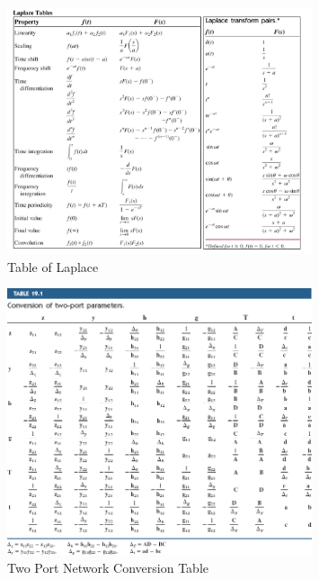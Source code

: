 \documentclass[10pt,landscape]{article}
\theoremstyle{definition}
\theoremstyle{remark}
\begin{document}
\begin{figure}
    \centering
    \includegraphics[width=0.8\textwidth,height=\textheight,keepaspectratio]{202/figure/laplace_transforms.png}
    \caption{Table of Laplace \cite{linares}}
    \label{fig:lapace_tb}
\end{figure}

\begin{figure}
    \centering
    \includegraphics[width=0.8\textwidth,height=\textheight,keepaspectratio]{202/figure/two_port_network_conversion_table.jpg}
    \caption{Two Port Network Conversion Table \cite{linares}}
    \label{fig:two_port}
\end{figure}
\end{document}
